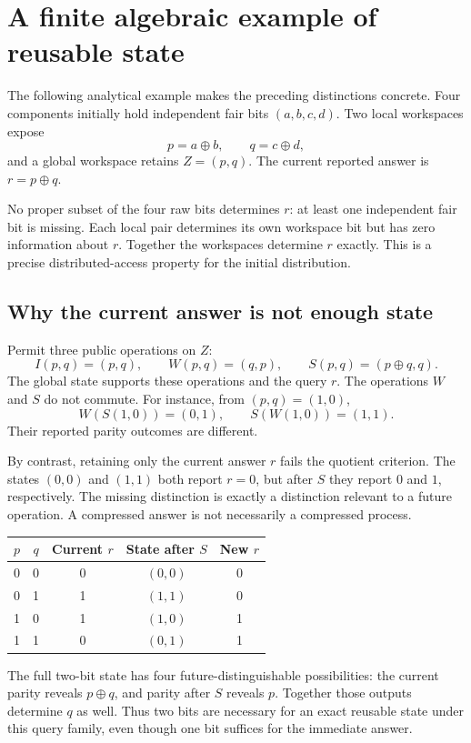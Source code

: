 \documentclass[11pt,oneside,openany]{book}
\numberwithin{equation}{section}
\begin{document}
\section{A finite algebraic example of reusable state}\label{MS:sec:worked}
The following analytical example makes the preceding distinctions concrete. Four components initially hold independent fair bits $(a,b,c,d)$. Two local workspaces expose
\[
p=a\oplus b,\qquad q=c\oplus d,
\]
and a global workspace retains $Z=(p,q)$. The current reported answer is $r=p\oplus q$.

No proper subset of the four raw bits determines $r$: at least one independent fair bit is missing. Each local pair determines its own workspace bit but has zero information about $r$. Together the workspaces determine $r$ exactly. This is a precise distributed-access property for the initial distribution.

\subsection{Why the current answer is not enough state}
Permit three public operations on $Z$:
\[
I(p,q)=(p,q),\qquad W(p,q)=(q,p),\qquad S(p,q)=(p\oplus q,q).
\]
The global state supports these operations and the query $r$. The operations $W$ and $S$ do not commute. For instance, from $(p,q)=(1,0)$,
\[
W(S(1,0))=(0,1),\qquad S(W(1,0))=(1,1).
\]
Their reported parity outcomes are different.

By contrast, retaining only the current answer $r$ fails the quotient criterion. The states $(0,0)$ and $(1,1)$ both report $r=0$, but after $S$ they report $0$ and $1$, respectively. The missing distinction is exactly a distinction relevant to a future operation. A compressed answer is not necessarily a compressed process.

\begin{center}
\begin{tabular}{@{}ccccc@{}}
\toprule
$p$ & $q$ & Current $r$ & State after $S$ & New $r$\\
\midrule
0&0&0&$(0,0)$&0\\
0&1&1&$(1,1)$&0\\
1&0&1&$(1,0)$&1\\
1&1&0&$(0,1)$&1\\
\bottomrule
\end{tabular}
\end{center}

The full two-bit state has four future-distinguishable possibilities: the current parity reveals $p\oplus q$, and parity after $S$ reveals $p$. Together those outputs determine $q$ as well. Thus two bits are necessary for an exact reusable state under this query family, even though one bit suffices for the immediate answer.
\end{document}
